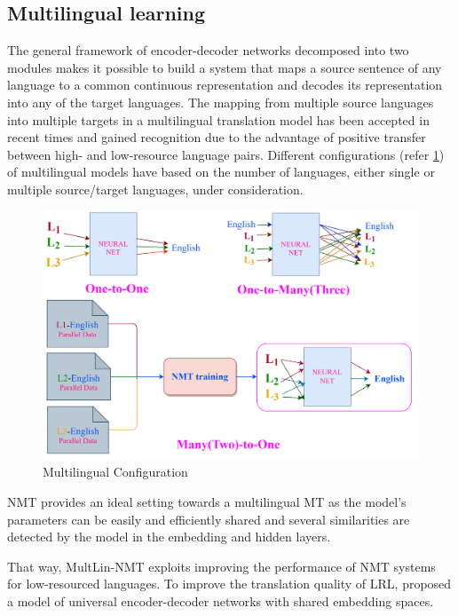 \documentclass[manuscript,screen]{acmart}
\begin{document}
\subsection{Multilingual learning}
The general framework of encoder-decoder networks decomposed into two modules makes it possible to build a system that maps a source sentence of any language to a common continuous representation and decodes its representation into any of the target languages. The mapping from multiple source languages into multiple targets in a multilingual translation model has been accepted in recent times and gained recognition due to the advantage of positive transfer between high- and low-resource language pairs. Different configurations (refer \ref{multilingual-configuration}) of multilingual models have based on the number of languages, either single or multiple source/target languages, under consideration.
\begin{figure}[!h]
  \centering
  \includegraphics[width=0.9\linewidth]{MultilingualConfiguaration.png}
  \caption{Multilingual Configuration}
  \label{multilingual-configuration}
\end{figure}
NMT provides an ideal setting towards a multilingual MT as the model's parameters can be easily and efficiently shared and several similarities are detected by the model in the embedding and hidden layers.

That way, MultLin-NMT exploits improving the performance of NMT systems for low-resourced languages. To improve the translation quality of LRL, \citet{gu2018universal} proposed a model of universal encoder-decoder networks with shared embedding spaces.
\end{document}
